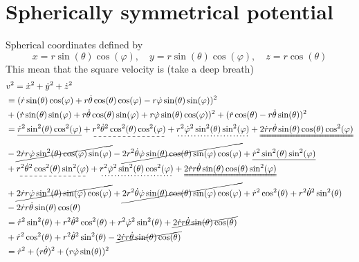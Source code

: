 \documentclass{article}
\begin{document}
    \section{Spherically symmetrical potential}
        Spherical coordinates defined by 
        \begin{equation*}
            x = r \sin(\theta) \cos(\varphi), \quad y = r \sin(\theta) \cos(\varphi), \quad z = r \cos(\theta)
        \end{equation*}
        This mean that the square velocity is (take a deep breath)
        \begin{align*}
            &v^2 = \dot x^2 + \dot y^2 + \dot z^2 \\
            & = (\dot r \sin(\theta) \cos(\varphi) + r \dot \theta \cos(\theta) \cos(\varphi) - r \dot \varphi \sin(\theta) \sin(\varphi))^2 \\
            & +  (\dot r \sin(\theta) \sin(\varphi) + r \dot \theta \cos(\theta) \sin(\varphi) + r \dot \varphi \sin(\theta)\cos(\varphi))^2 
            + (\dot r \cos(\theta) - r \dot \theta \sin(\theta))^2 \\
            & = \underline{\dot r^2 \sin^2(\theta) \cos^2(\varphi)} + \dashuline{r^2 \dot \theta^2 \cos^2(\theta) \cos^2(\varphi)} + \dotuline{r^2 \dot \varphi^2 \sin^2(\theta) \sin^2(\varphi)} + \uuline{2 \dot r r \dot \theta \sin(\theta)\cos(\theta) \cos^2(\varphi)} \\
            & - \cancel{2 \dot r r \dot \varphi \sin^2(\theta) \cos(\varphi) \sin(\varphi)} - \cancel{2 r^2\dot \theta \dot \varphi \sin(\theta)\cos(\theta)\sin(\varphi)\cos(\varphi)} +  \underline{\dot r^2 \sin^2(\theta) \sin^2(\varphi)}  \\
            & + \dashuline{r^2 \dot \theta^2 \cos^2(\theta) \sin^2(\varphi)} + \dotuline{r^2 \dot \varphi^2 \sin^2(\theta) \cos^2(\varphi)} + \uuline{2 \dot r r \dot \theta \sin(\theta) \cos(\theta) \sin^2(\varphi)}\\
            &  + \cancel{2 \dot r r \dot \varphi \sin^2(\theta) \sin(\varphi) \cos(\varphi)}  + \cancel{2 r^2\dot \theta \dot \varphi \sin(\theta)\cos(\theta)\sin(\varphi)\cos(\varphi)}  + \dot r^2 \cos^2(\theta) + r^2 \dot \theta^2 \sin^2(\theta) \\
            & - 2 \dot r r \dot \theta \sin(\theta) \cos(\theta) \\
            & = \dot r^2 \sin^2(\theta) + r^2 \dot \theta^2 \cos^2(\theta) + r^2 \dot \varphi^2 \sin^2(\theta) + \cancel{2 \dot r r \dot \theta \sin(\theta)\cos(\theta)} \\
            &  + \dot r^2 \cos^2(\theta) + r^2 \dot \theta^2 \sin^2(\theta) - \cancel{2 \dot r r \dot \theta \sin(\theta) \cos(\theta) }\\
            & = \dot r^2 + (r \dot \theta)^2 + (r \dot \varphi \sin(\theta))^2
        \end{align*}
\end{document}
